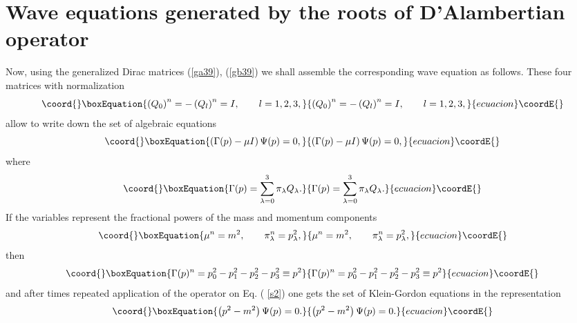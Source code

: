 \documentclass[a4paper,a4paper]{article}
\begin{document}
\section{Wave equations generated by the roots \newline
of D'Alambertian operator \coordHE{}}

Now, using the generalized Dirac matrices (\ref{ga39}), (\ref{gb39}) we
shall assemble the corresponding wave equation as follows. These four
matrices with normalization 
\begin{equation}\coord{}\boxEquation{
\left( Q_{0}\right) ^{n}=-\left( Q_{l}\right) ^{n}=I,\qquad l=1,2,3,
\label{s1}
}{
\left( Q_{0}\right) ^{n}=-\left( Q_{l}\right) ^{n}=I,\qquad l=1,2,3,
}{ecuacion}\coordE{}\end{equation}%
allow to write down the set of algebraic equations 
\begin{equation}\coord{}\boxEquation{
\left( \Gamma (p)-\mu I\right) \Psi (p)=0,  \label{s2}
}{
\left( \Gamma (p)-\mu I\right) \Psi (p)=0,  }{ecuacion}\coordE{}\end{equation}%
where%
\begin{equation}\coord{}\boxEquation{
\Gamma (p)=\sum_{\lambda =0}^{3}\pi _{\lambda }Q_{\lambda }.  \label{s3}
}{
\Gamma (p)=\sum_{\lambda =0}^{3}\pi _{\lambda }Q_{\lambda }.  }{ecuacion}\coordE{}\end{equation}%
If the variables \myHighlight{$\mu ,\ \pi _{\lambda }$}\coordHE{} represent the fractional powers of
the mass and momentum components%
\begin{equation}\coord{}\boxEquation{
\mu ^{n}=m^{2},\qquad \pi _{\lambda }^{n}=p_{\lambda }^{2},  \label{sa3}
}{
\mu ^{n}=m^{2},\qquad \pi _{\lambda }^{n}=p_{\lambda }^{2},  }{ecuacion}\coordE{}\end{equation}%
then 
\begin{equation}\coord{}\boxEquation{
\Gamma (p)^{n}=p_{0}^{2}-p_{1}^{2}-p_{2}^{2}-p_{3}^{2}\equiv p^{2}
\label{sb3}
}{
\Gamma (p)^{n}=p_{0}^{2}-p_{1}^{2}-p_{2}^{2}-p_{3}^{2}\equiv p^{2}
}{ecuacion}\coordE{}\end{equation}%
and after \coordHE{} times repeated application of the operator \myHighlight{$\Gamma $}\coordHE{} on Eq. (%
\ref{s2}) one gets the set of Klein-Gordon equations in the \coordHE{}%
representation 
\begin{equation}\coord{}\boxEquation{
\left( p^{2}-m^{2}\right) \Psi (p)=0.  \label{s4}
}{
\left( p^{2}-m^{2}\right) \Psi (p)=0.  }{ecuacion}\coordE{}\end{equation}%
\end{document}
